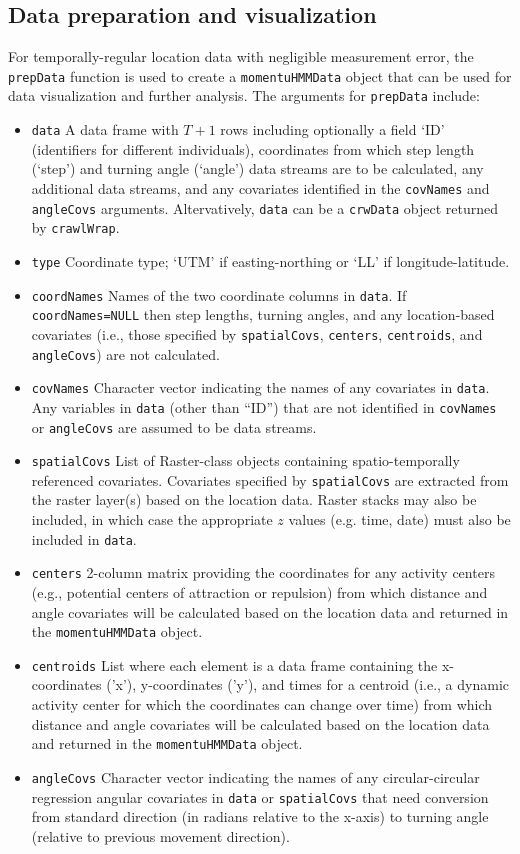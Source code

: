\documentclass[12pt]{article}\usepackage[]{graphicx}\usepackage[]{color}
\begin{document}
\subsection{Data preparation and visualization}
For temporally-regular location data with negligible measurement error, the \verb|prepData| function is used to create a \verb|momentuHMMData| object that can be used for data visualization and further analysis. The arguments for \verb|prepData| include:
\begin{itemize}
  \item{\verb|data|} A data frame with $T+1$ rows including optionally a field `ID' (identifiers for different individuals), coordinates from which step length (`step') and turning angle (`angle') data streams are to be calculated, any additional data streams, and any covariates identified in the \verb|covNames| and \verb|angleCovs| arguments. Altervatively, \verb|data| can be a \verb|crwData| object returned by \verb|crawlWrap|.
  \item{\verb|type|} Coordinate type; `UTM' if easting-northing or `LL' if longitude-latitude.
  \item{\verb|coordNames|} Names of the two coordinate columns in \verb|data|. If \verb|coordNames=NULL| then step lengths, turning angles, and any location-based covariates (i.e., those specified by \verb|spatialCovs|, \verb|centers|, \verb|centroids|, and \verb|angleCovs|) are not calculated.
  \item{\verb|covNames|} Character vector indicating the names of any covariates in \verb|data|. Any variables in \verb|data| (other than ``ID'') that are not identified in \verb|covNames| or \verb|angleCovs| are assumed to be data streams.
  \item{\verb|spatialCovs|} List of Raster-class objects \citep{Hijmans2016} containing spatio-temporally referenced covariates. Covariates specified by \verb|spatialCovs| are extracted from the raster layer(s) based on the location data. Raster stacks may also be included, in which case the appropriate $z$ values (e.g. time, date) must also be included in \verb|data|.
  \item{\verb|centers|} 2-column matrix providing the coordinates for any activity centers (e.g., potential centers of attraction or repulsion) from which distance and angle covariates will be calculated based on the location data and returned in the \verb|momentuHMMData| object.
  \item{\verb|centroids|} List where each element is a data frame containing the x-coordinates ('x'), y-coordinates ('y'), and times for a centroid (i.e., a dynamic activity center for which the coordinates can change over time) from which distance and angle covariates will be calculated based on the location data and returned in the \verb|momentuHMMData| object.
  \item{\verb|angleCovs|} Character vector indicating the names of any circular-circular regression angular covariates in \verb|data| or \verb|spatialCovs| that need conversion from standard direction (in radians relative to the x-axis) to turning angle (relative to previous movement direction).
\end{itemize}
\end{document}
